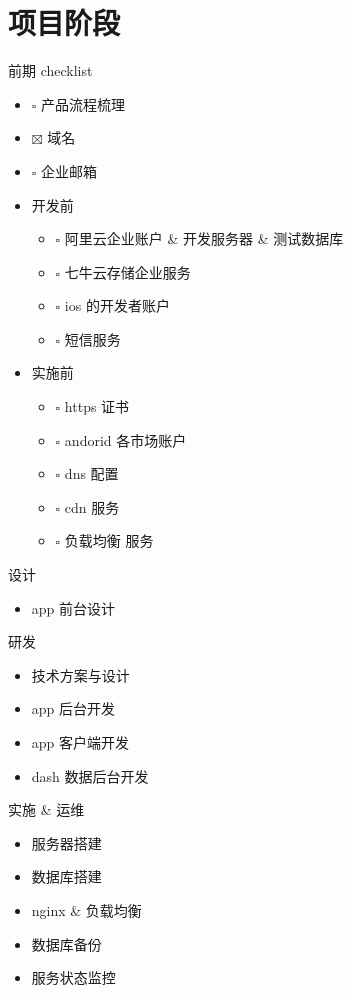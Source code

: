 \documentclass[presentation, bigger]{beamer}
\begin{document}
\section{项目阶段}
\label{sec:org36901d3}
\begin{frame}[label={sec:org2c2e7bb}]{前期 checklist}
\begin{itemize}
\item $\square$ 产品流程梳理
\item $\boxtimes$ 域名
\item $\square$ 企业邮箱
\item\relax [0/4] 开发前
\begin{itemize}
\item $\square$ 阿里云企业账户 \& 开发服务器 \& 测试数据库
\item $\square$ 七牛云存储企业服务
\item $\square$ ios 的开发者账户
\item $\square$ 短信服务
\end{itemize}
\item\relax [0/5] 实施前
\begin{itemize}
\item $\square$ https 证书
\item $\square$ andorid 各市场账户
\item $\square$ dns 配置
\item $\square$ cdn 服务
\item $\square$ 负载均衡 服务
\end{itemize}
\end{itemize}
\end{frame}
\begin{frame}[label={sec:org6187363}]{设计}
\begin{itemize}
\item app 前台设计
\end{itemize}
\end{frame}
\begin{frame}[label={sec:org0f5a545}]{研发}
\begin{itemize}
\item 技术方案与设计
\item app 后台开发
\item app 客户端开发
\item dash 数据后台开发
\end{itemize}
\end{frame}
\begin{frame}[label={sec:org67a3c1c}]{实施 \& 运维}
\begin{itemize}
\item 服务器搭建
\item 数据库搭建
\item nginx \& 负载均衡
\item 数据库备份
\item 服务状态监控
\end{itemize}
\end{frame}
\end{document}
